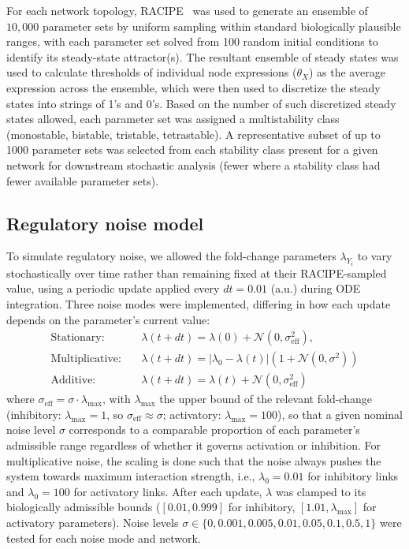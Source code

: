 \documentclass[11pt]{article}
\begin{document}
For each network topology, RACIPE~\cite{Huang2017} was used to generate an ensemble of $10{,}000$ parameter sets by uniform sampling within standard biologically plausible ranges, with each parameter set solved from 100 random initial conditions to identify its steady-state attractor(s). The resultant ensemble of steady states was used to calculate thresholds of individual node expressions ($\theta_X$) as the average expression across the ensemble, which were then used to discretize the steady states into strings of 1's and 0's. Based on the number of such discretized steady states allowed, each parameter set was assigned a multistability class (monostable, bistable, tristable, tetrastable). A representative subset of up to 1000 parameter sets was selected from each stability class present for a given network for downstream stochastic analysis (fewer where a stability class had fewer available parameter sets).

\subsection{Regulatory noise model} \label{sec:noise}

To simulate regulatory noise, we allowed the fold-change parameters $\lambda_{Y_i}$ to vary stochastically over time rather than remaining fixed at their RACIPE-sampled value, using a periodic update applied every $dt = 0.01$ (a.u.) during ODE integration. Three noise modes were implemented, differing in how each update depends on the parameter's current value:
\begin{align}
\text{Stationary:} \quad & \lambda(t+dt) = \lambda(0) + \mathcal{N}(0, \sigma_{\text{eff}}^2),\\
\text{Multiplicative:} \quad & \lambda(t+dt) = |\lambda_0 - \lambda(t)|\left(1 + \mathcal{N}(0, \sigma^2)\right)\\
\text{Additive:} \quad & \lambda(t+dt) = \lambda(t) + \mathcal{N}(0, \sigma_{\text{eff}}^2)
\end{align}
where $\sigma_{\text{eff}} = \sigma \cdot \lambda_{\max}$, with $\lambda_{\max}$ the upper bound of the relevant fold-change (inhibitory: $\lambda_{\max} = 1$, so $\sigma_{\text{eff}} \approx \sigma$; activatory: $\lambda_{\max} = 100$), so that a given nominal noise level $\sigma$ corresponds to a comparable proportion of each parameter's admissible range regardless of whether it governs activation or inhibition.  For multiplicative noise, the scaling is done such that the noise always pushes the system towards maximum interaction strength, i.e., $\lambda_0 = 0.01$ for inhibitory links and $\lambda_0 = 100$ for activatory links. After each update, $\lambda$ was clamped to its biologically admissible bounds ($[0.01, 0.999]$ for inhibitory, $[1.01, \lambda_{\max}]$ for activatory parameters). Noise levels $\sigma \in \{0, 0.001, 0.005, 0.01, 0.05, 0.1, 0.5, 1\}$ were tested for each noise mode and network.
\end{document}

